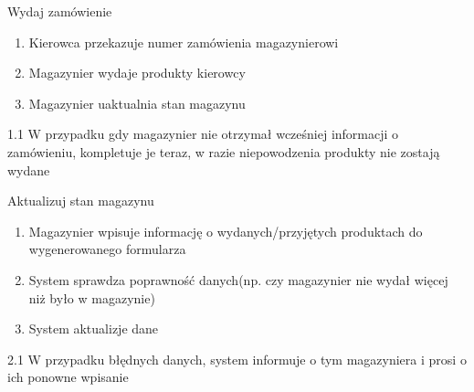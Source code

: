 	\begin{usecase}{Wydaj zamówienie}
		\author{Arkadiusz Socha} 
		\maketitle
\begin{scenario}
 
			\begin{enumerate}
				\item Kierowca przekazuje numer zamówienia magazynierowi
				\item Magazynier wydaje produkty kierowcy
				\item Magazynier uaktualnia stan magazynu
			\end{enumerate}
		\end{scenario}
\begin{extensions}
		1.1 W przypadku gdy magazynier nie otrzymał wcześniej informacji o zamówieniu, kompletuje je teraz, w razie niepowodzenia produkty nie zostają wydane\\
	\end{extensions}
\end{usecase}

	\begin{usecase}{Aktualizuj stan magazynu}
		\author{Arkadiusz Socha} 
		\maketitle
\begin{scenario}
 
			\begin{enumerate}
				\item Magazynier wpisuje informację o wydanych/przyjętych produktach do wygenerowanego formularza
				\item System sprawdza poprawność danych(np. czy magazynier nie wydał więcej niż było w magazynie)
				\item System aktualizje dane
			\end{enumerate}
		\end{scenario}
\begin{extensions}
		2.1 W przypadku błędnych danych, system informuje o tym magazyniera i prosi o ich ponowne wpisanie\\
	\end{extensions}
\end{usecase}

